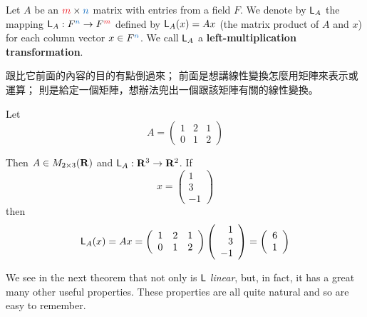 \begin{definition} \label{def 2.11}
Let \(A\) be an \(\RED{m} \X \BLUE{n}\) matrix with entries from a field \(F\).
We denote by \(\textsf{L}_A\) the mapping \(\LMTRAN_A: F^{\BLUE{n}} \to F^{\RED{m}}\) defined by \(\textsf{L}_A(x) = Ax\) (the matrix product of \(A\) and \(x\)) for each column vector \(x \in F^{\BLUE{n}}\).
We call \(\textsf{L}_A\) a \textbf{left-multiplication transformation}.
\end{definition}

\begin{note}
 跟比它前面的內容的目的有點倒過來；
前面是想講線性變換怎麼用矩陣來表示或運算；
 則是給定一個矩陣，想辦法兜出一個跟該矩陣有關的線性變換。
\end{note}

\begin{example} \label{example 2.3.4}
Let
\[
    A=\left(\begin{array}{lll}
        1 & 2 & 1 \\
        0 & 1 & 2
    \end{array}\right)
\]

Then \(A \in M_{2 \times 3}(\mathbf{R})\) and \(\textsf{L}_A: \mathbf{R}^{3} \to \mathbf{R}^{2}\).
If
\[
    x=\left(\begin{array}{r}
        1 \\ 3 \\ -1
    \end{array}\right)
\]
then
\[
    \textsf{L}_{A}(x)=A x=\left(\begin{array}{lll}
        1 & 2 & 1 \\ 0 & 1 & 2
    \end{array}\right)\left(\begin{array}{r}
        1 \\ 3 \\ -1
    \end{array}\right)
    =\left(\begin{array}{l}
        6 \\ 1
    \end{array}\right)
\]
\end{example}

We see in the next theorem that not only is \(\textsf{L}\) \emph{linear}, but, in fact, it has a great many other useful properties.
These properties are all quite natural and so are easy to remember.

